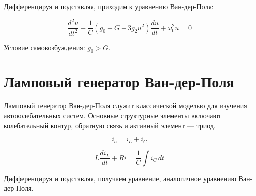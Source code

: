 \documentclass[a4paper,12pt]{article}
\begin{document}
Дифференцируя и подставляя, приходим к уравнению Ван-дер-Поля:

\begin{equation}
\frac{d^2 u}{dt^2} - \frac{1}{C} (g_0 - G - 3g_2 u^2) \frac{du}{dt} + \omega_0^2 u = 0
\end{equation}

Условие самовозбуждения: $g_0 > G$.

\section{Ламповый генератор Ван-дер-Поля}

Ламповый генератор Ван-дер-Поля служит классической моделью для изучения автоколебательных систем. Основные структурные элементы включают колебательный контур, обратную связь и активный элемент — триод.

\begin{equation}
i_a = i_L + i_C
\end{equation}

\begin{equation}
L \frac{di_L}{dt} + Ri = \frac{1}{C} \int i_C \, dt
\end{equation}

Дифференцируя и подставляя, получаем уравнение, аналогичное уравнению Ван-дер-Поля.
\end{document}
